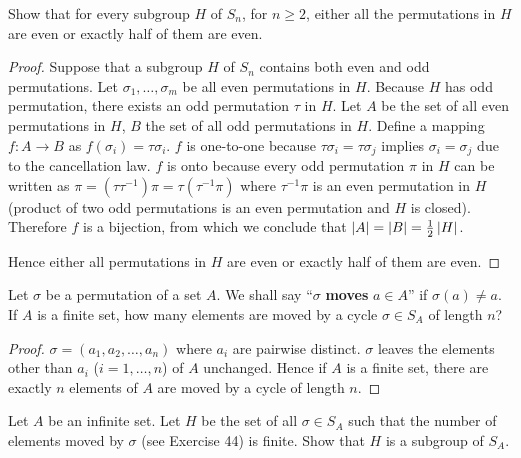 \begin{exercise}
    Show that for every subgroup $H$ of $S_{n}$, for $n\geq 2$, either all the permutations in $H$ are even or exactly half of them are even.
\end{exercise}

\begin{proof}
    Suppose that a subgroup $H$ of $S_{n}$ contains both even and odd permutations. Let $\sigma_{1}, \ldots, \sigma_{m}$ be all even permutations in $H$. Because $H$ has odd permutation, there exists an odd permutation $\tau$ in $H$. Let $A$ be the set of all even permutations in $H$, $B$ the set of all odd permutations in $H$. Define a mapping $f: A\to B$ as $f(\sigma_{i}) = \tau\sigma_{i}$. $f$ is one-to-one because $\tau\sigma_{i} = \tau\sigma_{j}$ implies $\sigma_{i} = \sigma_{j}$ due to the cancellation law. $f$ is onto because every odd permutation $\pi$ in $H$ can be written as $\pi = (\tau\tau^{-1})\pi = \tau(\tau^{-1}\pi)$ where $\tau^{-1}\pi$ is an even permutation in $H$ (product of two odd permutations is an even permutation and $H$ is closed). Therefore $f$ is a bijection, from which we conclude that $\left\vert{A}\right\vert = \left\vert{B}\right\vert = \frac{1}{2}\left\vert{H}\right\vert$.

    Hence either all permutations in $H$ are even or exactly half of them are even.
\end{proof}

\begin{exercise}
    Let $\sigma$ be a permutation of a set $A$. We shall say ``$\sigma$ \textbf{moves} $a\in A$'' if $\sigma(a)\ne a$. If $A$ is a finite set, how many elements are moved by a cycle $\sigma\in S_{A}$ of length $n$?
\end{exercise}

\begin{proof}
    $\sigma = (a_{1}, a_{2}, \ldots, a_{n})$ where $a_{i}$ are pairwise distinct. $\sigma$ leaves the elements other than $a_{i}$ ($i = 1,\ldots, n$) of $A$ unchanged. Hence if $A$ is a finite set, there are exactly $n$ elements of $A$ are moved by a cycle of length $n$.
\end{proof}

\begin{exercise}
    Let $A$ be an infinite set. Let $H$ be the set of all $\sigma\in S_{A}$ such that the number of elements moved by $\sigma$ (see Exercise 44) is finite. Show that $H$ is a subgroup of $S_{A}$.
\end{exercise}

